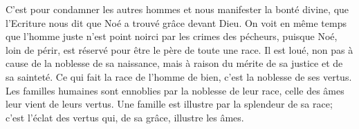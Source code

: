 C’est pour condamner les autres hommes et nous manifester la bonté divine,
	que l’Ecriture nous dit que Noé a trouvé grâce devant Dieu.
On voit en même temps que l’homme juste
	n’est point noirci par les crimes des pécheurs,
	puisque Noé, loin de périr,
	est réservé pour être le père de toute une race.
Il est loué, non pas à cause de la noblesse de sa naissance,
	mais à raison du mérite de sa justice et de sa sainteté.
Ce qui fait la race de l’homme de bien, c’est la noblesse de ses vertus.
Les familles humaines sont ennoblies par la noblesse de leur race,
	celle des âmes leur vient de leurs vertus.
	Une famille est illustre par la splendeur de sa race;
	c’est l’éclat des vertus qui, de sa grâce, illustre les âmes.
